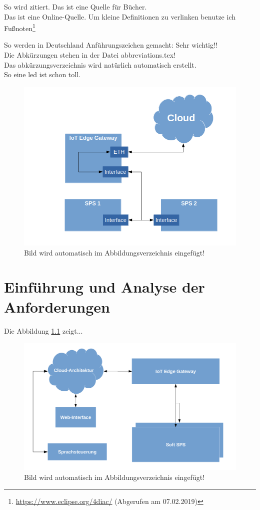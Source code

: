 So wird zitiert\cite{booktest}. Das ist eine Quelle für Bücher. \\
Das ist eine Online-Quelle\cite{wikimoscow}.
Um kleine Definitionen zu verlinken benutze ich Fußnoten\footnote{\url{ https://www.eclipse.org/4diac/} (Abgerufen am 07.02.2019)}

So werden in Deutschland Anführungszeichen gemacht: \glqq Sehr wichtig!!\grqq{}  \\

Die Abkürzungen stehen in der Datei abbreviations.tex! \\
Das abkürzungsverzeichnis wird natürlich automatisch erstellt.\\

So eine \gls{led} ist schon toll.

\begin{figure}[H]
\includegraphics[scale=0.5]{pictures/GatewayKommunikation.png} 
\caption{Bild wird automatisch im Abbildungsverzeichnis eingefügt!}
\label{fig:gateway}
\end{figure}


\chapter{Einführung und Analyse der Anforderungen}
Die Abbildung \ref{fig:archgrob} zeigt...
\begin{figure}[H]
\includegraphics[scale=0.3]{pictures/Architektur-grob.png} 
\caption{Bild wird automatisch im Abbildungsverzeichnis eingefügt!}
\label{fig:archgrob}
\end{figure}


